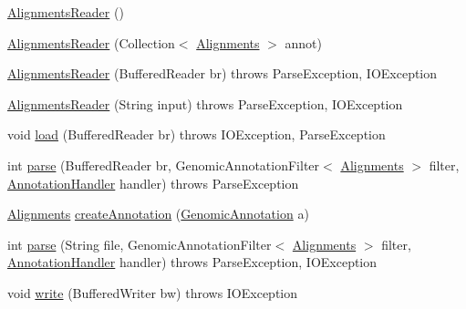 \begin{DoxyCompactItemize}
\item 
\hyperlink{classbroad_1_1pda_1_1datastructures_1_1_alignments_reader_ab1bc7b4b083a051beaf9d76fd67ea7c9}{Alignments\+Reader} ()
\item 
\hyperlink{classbroad_1_1pda_1_1datastructures_1_1_alignments_reader_a75d9fadbd719e1e177ba1b094e435322}{Alignments\+Reader} (Collection$<$ \hyperlink{classbroad_1_1pda_1_1datastructures_1_1_alignments}{Alignments} $>$ annot)
\item 
\hyperlink{classbroad_1_1pda_1_1datastructures_1_1_alignments_reader_aad8f8db4324bc65f53b0c936fad81be4}{Alignments\+Reader} (Buffered\+Reader br)  throws Parse\+Exception, I\+O\+Exception 
\item 
\hyperlink{classbroad_1_1pda_1_1datastructures_1_1_alignments_reader_a1ddd8995cc8501db45ac70ea6d6c2c21}{Alignments\+Reader} (String input)  throws Parse\+Exception, I\+O\+Exception 
\item 
void \hyperlink{classbroad_1_1pda_1_1datastructures_1_1_alignments_reader_a1887a64862d626da7a749819ec45a50d}{load} (Buffered\+Reader br)  throws I\+O\+Exception, Parse\+Exception 
\item 
int \hyperlink{classbroad_1_1pda_1_1datastructures_1_1_alignments_reader_a8463fb48d9ac9c7be46a4451d2bfc165}{parse} (Buffered\+Reader br, Genomic\+Annotation\+Filter$<$ \hyperlink{classbroad_1_1pda_1_1datastructures_1_1_alignments}{Alignments} $>$ filter, \hyperlink{interfacebroad_1_1core_1_1annotation_1_1_annotation_handler}{Annotation\+Handler} handler)  throws Parse\+Exception 
\item 
\hyperlink{classbroad_1_1pda_1_1datastructures_1_1_alignments}{Alignments} \hyperlink{classbroad_1_1pda_1_1datastructures_1_1_alignments_reader_a248dffdc961399ecbf3103abc357ee49}{create\+Annotation} (\hyperlink{interfacebroad_1_1core_1_1annotation_1_1_genomic_annotation}{Genomic\+Annotation} a)
\item 
int \hyperlink{classbroad_1_1pda_1_1datastructures_1_1_alignments_reader_a1ac2171ed9ec4929050891bfd3f51e07}{parse} (String file, Genomic\+Annotation\+Filter$<$ \hyperlink{classbroad_1_1pda_1_1datastructures_1_1_alignments}{Alignments} $>$ filter, \hyperlink{interfacebroad_1_1core_1_1annotation_1_1_annotation_handler}{Annotation\+Handler} handler)  throws Parse\+Exception, I\+O\+Exception 
\item 
void \hyperlink{classbroad_1_1pda_1_1datastructures_1_1_alignments_reader_a3b3aa616f2fdc33d135c46b84a7a1bf9}{write} (Buffered\+Writer bw)  throws I\+O\+Exception 
\end{DoxyCompactItemize}


